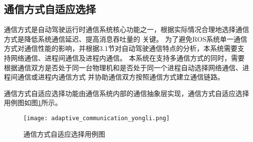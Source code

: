 \subsection{通信方式自适应选择}
通信方式是自动驾驶运行时通信系统核心功能之一，根据实际情况合理地选择通信方式是降低系统通信延迟、提高消息吞吐量的
关键。
为了避免ROS系统单一通信方式对通信性能的影响，并根据3.1节对自动驾驶通信特点的分析，本系统需要支持网络通信、进程间通信及进程内通信。
本系统在支持多通信方式的同时，需要根据通信双方是否处于同一台物理机和是否处于同一个进程自动选择网络通信、进程间通信或进程内通信方式
并协助通信双方按照通信方式建立通信链路。

通信方式自适应选择功能由通信系统内部的通信抽象层实现，通信方式自适应选择用例图如图\ref{adaptive_communication_yongli}所示。

\begin{figure}[H]
  \centering
  \texttt{[image: adaptive\_communication\_yongli.png]}
  \caption{通信方式自适应选择用例图}
  \label{adaptive_communication_yongli}
\end{figure}




